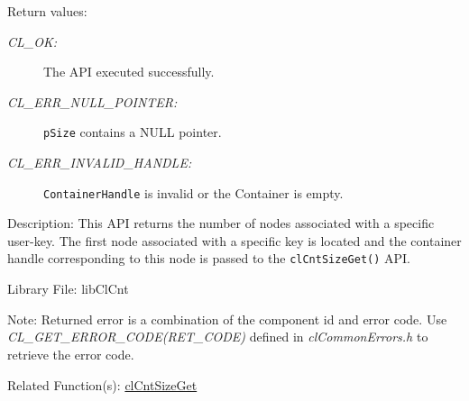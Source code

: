 \begin{Desc}
\item[Return values:]
\begin{description}
\item[{\em CL\_\-OK:}]The API executed successfully. 
\item[{\em CL\_\-ERR\_\-NULL\_\-POINTER:}]{\tt{pSize}} contains a NULL pointer. 
\item[{\em CL\_\-ERR\_\-INVALID\_\-HANDLE:}]{\tt{ContainerHandle}} is invalid or the Container is empty.
\end{description}
\end{Desc}
\begin{Desc}
\item[Description:]
This API returns the number of nodes associated with a specific user-key. The first node associated with a specific key is located
and the container handle corresponding to this node is passed to the {\tt{clCntSizeGet()}} API.
\end{Desc}
\begin{Desc}
\item[Library File:]lib\-Cl\-Cnt\end{Desc}
\begin{Desc}
\item[Note:]Returned error is a combination of the component id and error code. Use \textit{CL\_\-GET\_\-ERROR\_\-CODE(RET\_\-CODE)} defined in \textit{clCommonErrors.h} to retrieve the error code.\end{Desc}
\begin{Desc}
\item[Related Function(s):]\hyperlink{pagecnt118}{cl\-Cnt\-Size\-Get} \end{Desc}



\newpage
